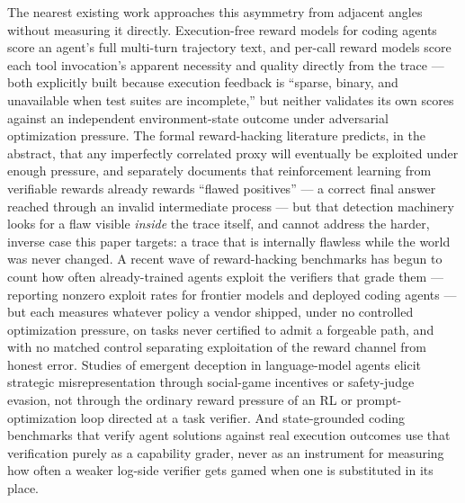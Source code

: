 \documentclass[11pt]{article}
\begin{document}
The nearest existing work approaches this asymmetry from adjacent angles without measuring it directly. Execution-free reward models for coding agents score an agent's full multi-turn trajectory text, and per-call reward models score each tool invocation's apparent necessity and quality directly from the trace --- both explicitly built because execution feedback is ``sparse, binary, and unavailable when test suites are incomplete,'' but neither validates its own scores against an independent environment-state outcome under adversarial optimization pressure. The formal reward-hacking literature predicts, in the abstract, that any imperfectly correlated proxy will eventually be exploited under enough pressure, and separately documents that reinforcement learning from verifiable rewards already rewards ``flawed positives'' --- a correct final answer reached through an invalid intermediate process --- but that detection machinery looks for a flaw visible \emph{inside} the trace itself, and cannot address the harder, inverse case this paper targets: a trace that is internally flawless while the world was never changed. A recent wave of reward-hacking benchmarks has begun to count how often already-trained agents exploit the verifiers that grade them --- reporting nonzero exploit rates for frontier models and deployed coding agents --- but each measures whatever policy a vendor shipped, under no controlled optimization pressure, on tasks never certified to admit a forgeable path, and with no matched control separating exploitation of the reward channel from honest error. Studies of emergent deception in language-model agents elicit strategic misrepresentation through social-game incentives or safety-judge evasion, not through the ordinary reward pressure of an RL or prompt-optimization loop directed at a task verifier. And state-grounded coding benchmarks that verify agent solutions against real execution outcomes use that verification purely as a capability grader, never as an instrument for measuring how often a weaker log-side verifier gets gamed when one is substituted in its place.
\end{document}
